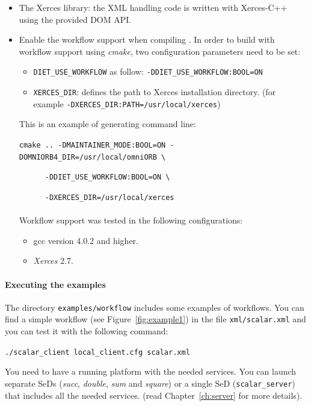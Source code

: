 \begin{itemize}
\item The Xerces library: the XML handling code is written with
  Xerces-C++ using the provided DOM API.
\item Enable the workflow support when compiling \diet. In order to build \diet with workflow support using \textit{cmake}, two
configuration parameters need to be set:

\begin{itemize}
\item \texttt{DIET\_USE\_WORKFLOW} as follow: \texttt{-DDIET\_USE\_WORKFLOW:BOOL=ON}
\item \texttt{XERCES\_DIR}: defines the path to Xerces installation directory.
  (for example \texttt{-DXERCES\_DIR:PATH=/usr/local/xerces})
\end{itemize}

This is an example of generating command line:

\verb|cmake .. -DMAINTAINER_MODE:BOOL=ON -DOMNIORB4_DIR=/usr/local/omniORB \|

\verb|      -DDIET_USE_WORKFLOW:BOOL=ON \|

\verb|      -DXERCES_DIR=/usr/local/xerces|


\paragraph{}
Workflow support was tested in the following configurations:

\begin{itemize}
\item gcc version 4.0.2 and higher.
\item \textit{Xerces} 2.7.
\end{itemize}
\end{itemize}

\paragraph{Executing the examples}

The directory \texttt{examples/workflow} includes some examples of
workflows.  You can find a simple workflow (see
Figure~\ref{fig:example1}) in the file \texttt{xml/scalar.xml} and you
can test it with the following command:

\verb|./scalar_client local_client.cfg scalar.xml |

You need to have a running \diet platform with the needed services. You
can launch separate SeDs (\textit{succ}, \textit{double}, \textit{sum}
and \textit{square}) or a single SeD (\texttt{scalar\_server}) that
includes all the needed services. (read Chapter~\ref{ch:server} for more
details).

